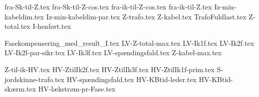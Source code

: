 \usepackage[utf8]{inputenc}%
\usepackage{amsmath}%
\usepackage{mathtools}%
\usepackage{icomma}%
\usepackage{siunitx}%
\usepackage{fp}%
\usepackage{xstring}%
\usepackage{listofitems}
\usepackage{ifthen}
\usepackage{gensymb} %

{fra-Sk-til-Z.tex}
{fra-Sk-til-Z-cos.tex}
{fra-ik-til-Z-cos.tex}
{fra-ik-til-Z.tex}
{Iz-min-kabeldim.tex}
{Iz-min-kabeldim-par.tex}
{Z-trafo.tex}
{Z-kabel.tex}
{TrafoFuldlast.tex}
{Z-total.tex}
{I-henført.tex}

{Fasekompensering_med_result_I.tex}
{LV-Z-total-max.tex}
{LV-Ik1f.tex}
{LV-Ik2f.tex}
{LV-Ik2f-par-sikr.tex}
{LV-Ik3f.tex}
{LV-spændingsfald.tex}
{Z-kabel-max.tex}

{Z-til-ik-HV.tex}
{HV-ZtilIk2f.tex}
{HV-ZtilIk3f.tex}
{HV-ZtilIk1f-prim.tex}
{S-jordskinne-trafo.tex}
{HV-spændingsfald.tex}
{HV-KBtid-leder.tex}
{HV-KBtid-skærm.tex}
{HV-lækstrøm-pr-Fase.tex}

